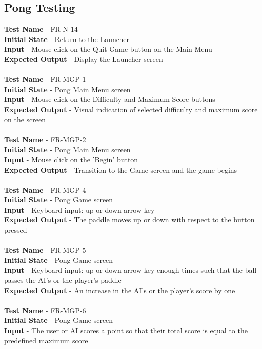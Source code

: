\documentclass[12pt, titlepage]{article}
\begin{document}
\subsection{Pong Testing}

\textbf{Test Name} - FR-N-14\\
\textbf{Initial State} - Return to the Launcher\\
\textbf{Input} - Mouse click on the Quit Game button on the Main Menu\\
\textbf{Expected Output} - Display the Launcher screen\\ \\
\textbf{Test Name} - FR-MGP-1\\
\textbf{Initial State} - Pong Main Menu screen\\
\textbf{Input} - Mouse click on the Difficulty and Maximum Score buttons\\
\textbf{Expected Output} - Visual indication of selected difficulty and maximum score on the screen\\ \\
\textbf{Test Name} - FR-MGP-2\\
\textbf{Initial State} - Pong Main Menu screen\\
\textbf{Input} - Mouse click on the 'Begin' button\\
\textbf{Expected Output} - Transition to the Game screen and the game begins\\ \\
\textbf{Test Name} - FR-MGP-4\\
\textbf{Initial State} - Pong Game screen\\
\textbf{Input} - Keyboard input: up or down arrow key\\
\textbf{Expected Output} - The paddle moves up or down with respect to the button pressed\\ \\
\textbf{Test Name} - FR-MGP-5\\
\textbf{Initial State} - Pong Game screen\\
\textbf{Input} - Keyboard input: up or down arrow key enough times such that the ball passes the AI's or the player's paddle\\
\textbf{Expected Output} - An increase in the AI's or the player's score by one\\ \\
\textbf{Test Name} - FR-MGP-6\\
\textbf{Initial State} - Pong Game screen\\
\textbf{Input} - The user or AI scores a point so that their total score is equal to the predefined maximum score\\
\end{document}
